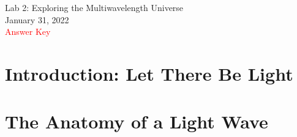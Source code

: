 \documentclass[11pt]{article}
\begin{document}
\begin{center}
\huge{Lab 2: Exploring the Multiwavelength Universe}\\ \medskip \Large{January 31, 2022} \\ \medskip \Large{\textcolor{red}{Answer Key}}
\end{center}

\section{Introduction: Let There Be Light}

\section{The Anatomy of a Light Wave}
\end{document}
